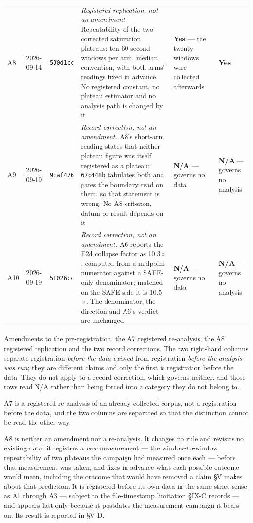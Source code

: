 \documentclass{ieeeaccess}
\begin{document}
\begin{table}[!t]
\begin{tabularx}{\textwidth}{lll>{\raggedright\arraybackslash}X>{\raggedright\arraybackslash}X>{\raggedright\arraybackslash}X}
A8 & 2026-09-14 & \texttt{590d1cc} & \textit{Registered replication, not an amendment.} Repeatability of the two corrected saturation plateaus: ten 60-second windows per arm, median convention, with both arms' readings fixed in advance. No registered constant, no plateau estimator and no analysis path is changed by it & {\bfseries Yes} --- the twenty windows were collected afterwards & {\bfseries Yes} \\
A9 & 2026-09-19 & \texttt{9caf476} & \textit{Record correction, not an amendment.} A8's short-arm reading states that neither plateau figure was itself registered as a plateau; \texttt{67c448b} tabulates both and gates the boundary read on them, so that statement is wrong. No A8 criterion, datum or result depends on it & {\bfseries N/A} --- governs no data & {\bfseries N/A} --- governs no analysis \\
A10 & 2026-09-19 & \texttt{51026cc} & \textit{Record correction, not an amendment.} A6 reports the E2d collapse factor as 10.3$\times$, computed from a midpoint numerator against a SAFE-only denominator; matched on the SAFE side it is 10.5$\times$. The denominator, the direction and A6's verdict are unchanged & {\bfseries N/A} --- governs no data & {\bfseries N/A} --- governs no analysis \\
\hline
\end{tabularx}
\end{table}

Amendments to the pre-registration, the A7 registered re-analysis, the A8 registered replication and the two record corrections. The two right-hand columns separate registration \textit{before the data existed} from registration \textit{before the analysis was run}; they are different claims and only the first is registration before the data. They do not apply to a record correction, which governs neither, and those rows read N/A rather than being forced into a category they do not belong to.

A7 is a registered re-analysis of an already-collected corpus, not a registration before the data, and the two columns are separated so that the distinction cannot be read the other way.

A8 is neither an amendment nor a re-analysis. It changes no rule and revisits no existing data: it registers a \textit{new} measurement --- the window-to-window repeatability of two plateaus the campaign had measured once each --- before that measurement was taken, and fixes in advance what each possible outcome would mean, including the outcome that would have removed a claim \S{}V makes about that prediction. It is registered before its own data in the same strict sense as A1 through A3 --- subject to the file-timestamp limitation \S{}IX-C records --- and appears last only because it postdates the measurement campaign it bears on. Its result is reported in \S{}V-D.
\end{document}
